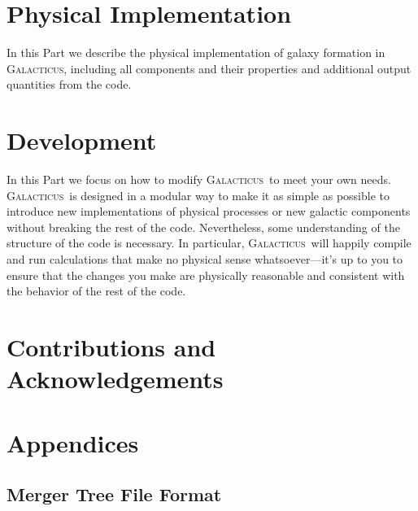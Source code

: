 \documentclass[letterpaper,10pt,headsepline]{scrbook}
\def\glc{{\normalfont \scshape Galacticus}}
\begin{document}


\part{Physical Implementation}

In this Part we describe the physical implementation of galaxy formation in \glc, including all components and their properties and additional output quantities from the code.









\part{Development}

In this Part we focus on how to modify \glc\ to meet your own needs. \glc\ is designed in a modular way to make it as simple as possible to introduce new implementations of physical processes or new galactic components without breaking the rest of the code. Nevertheless, some understanding of the structure of the code is necessary. In particular, \glc\ will happily compile and run calculations that make no physical sense whatsoever---it's up to you to ensure that the changes you make are physically reasonable and consistent with the behavior of the rest of the code.











\part{Contributions and Acknowledgements}





\appendix

\part{Appendices}

\chapter{Merger Tree File Format}\label{sec:MergerTreeFileFormat}
\end{document}
